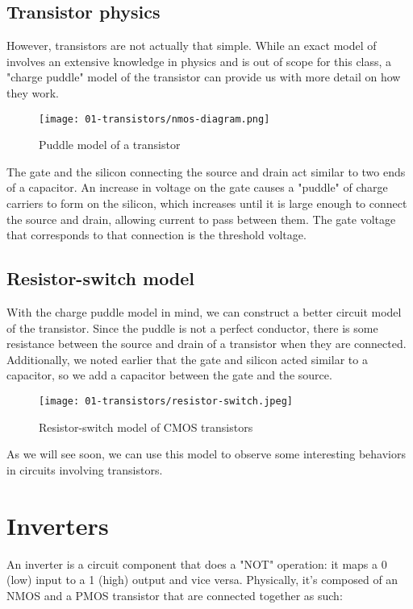 \documentclass[11pt]{article}
\begin{document}
\subsection{Transistor physics}

However, transistors are not actually that simple. While an exact model of involves an extensive knowledge in physics and is out of scope for this class, a "charge puddle" model of the transistor can provide us with more detail on how they work.

\begin{figure}[H]
    \centering
        \texttt{[image: 01-transistors/nmos-diagram.png]}
    \caption{Puddle model of a transistor}
\end{figure}

The gate and the silicon connecting the source and drain act similar to two ends of a capacitor. An increase in voltage on the gate causes a "puddle" of charge carriers to form on the silicon, which increases until it is large enough to connect the source and drain, allowing current to pass between them. The gate voltage that corresponds to that connection is the threshold voltage. 

\subsection{Resistor-switch model}

With the charge puddle model in mind, we can construct a better circuit model of the transistor. Since the puddle is not a perfect conductor, there is some resistance between the source and drain of a transistor when they are connected. Additionally, we noted earlier that the gate and silicon acted similar to a capacitor, so we add a capacitor between the gate and the source. 

\begin{figure}[H]
    \centering
        \texttt{[image: 01-transistors/resistor-switch.jpeg]}
    \caption{Resistor-switch model of CMOS transistors}
\end{figure}

As we will see soon, we can use this model to observe some interesting behaviors in circuits involving transistors.

\newpage
\section{Inverters}

An inverter is a circuit component that does a "NOT" operation: it maps a 0 (low) input to a 1 (high) output and vice versa. Physically, it's composed of an NMOS and a PMOS transistor that are connected together as such:
\end{document}
